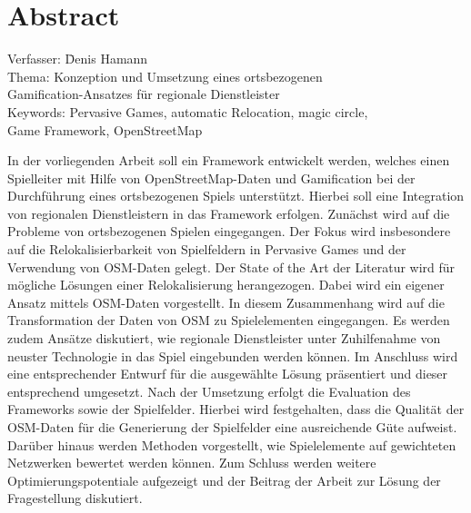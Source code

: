 \chapter*{Abstract}
\label{ch0:abstract}

\begin{tabbing}
Verfasser:	 \hspace{20mm} \= Denis Hamann\\
Thema:	  \> Konzeption und Umsetzung eines ortsbezogenen\\
		\> Gamification-Ansatzes für regionale Dienstleister\\
Keywords: \> Pervasive Games, automatic Relocation, magic circle,\\
		\> Game Framework, OpenStreetMap
\end{tabbing}
\vspace{1cm}
In der vorliegenden Arbeit soll ein Framework entwickelt werden, welches einen Spielleiter mit Hilfe von OpenStreetMap-Daten und Gamification bei der Durchführung eines ortsbezogenen Spiels unterstützt. Hierbei soll eine Integration von regionalen Dienstleistern in das Framework erfolgen.
Zunächst wird auf die Probleme von ortsbezogenen Spielen eingegangen.
Der Fokus wird insbesondere auf die Relokalisierbarkeit von Spielfeldern in Pervasive Games und der Verwendung von OSM-Daten gelegt. Der State of the Art der Literatur wird für mögliche Lösungen einer Relokalisierung herangezogen. Dabei wird ein eigener Ansatz mittels OSM-Daten vorgestellt. In diesem Zusammenhang wird auf die Transformation der Daten von OSM zu Spielelementen eingegangen.
Es werden zudem Ansätze diskutiert, wie regionale Dienstleister unter Zuhilfenahme von neuster Technologie in das Spiel eingebunden werden können.
Im Anschluss wird eine entsprechender Entwurf für die ausgewählte Lösung präsentiert und dieser entsprechend umgesetzt. Nach der Umsetzung erfolgt die Evaluation des Frameworks sowie der Spielfelder. Hierbei wird festgehalten, dass die Qualität der OSM-Daten für die Generierung der Spielfelder eine ausreichende Güte aufweist. Darüber hinaus werden Methoden vorgestellt, wie Spielelemente auf gewichteten Netzwerken bewertet werden können. Zum Schluss werden weitere Optimierungspotentiale aufgezeigt und der Beitrag der Arbeit zur Lösung der Fragestellung diskutiert.
